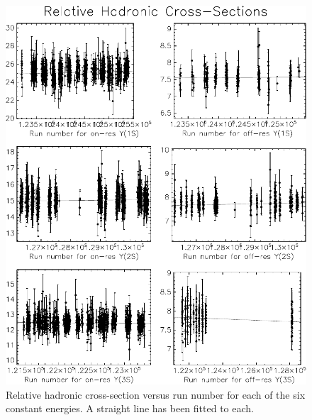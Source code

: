 \begin{figure}[p]
  \includegraphics[width=\linewidth]{plots/runbyrun_peaksconts}
  \caption{\label{runbyrun_peaksconts} Relative hadronic cross-section
    versus run number for each of the six constant energies.  A
    straight line has been fitted to each.}
\end{figure}

